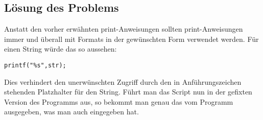 \subsection{Lösung des Problems}
Anstatt den vorher erwähnten print-Anweisungen sollten print-Anweisungen immer und überall mit Formats in der gewünschten
Form verwendet werden. Für einen String würde das so aussehen:
\begin{lstlisting}
printf("%s",str);
\end{lstlisting}
Dies verhindert den unerwünschten Zugriff durch den in Anführungszeichen stehenden Platzhalter für den String.
Führt man das Script nun in der gefixten Version des Programms aus, so bekommt man genau das vom Programm ausgegeben,
was man auch eingegeben hat.